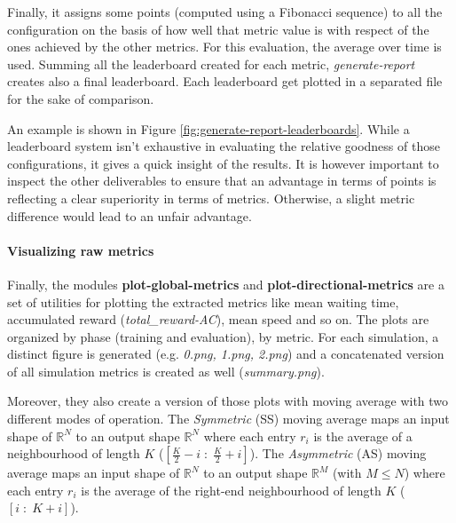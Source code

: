 Finally, it assigns some points (computed using a Fibonacci sequence) to all the configuration on the basis of how well that metric value is with respect of the ones achieved by the other metrics.
For this evaluation, the average over time is used.
Summing all the leaderboard created for each metric, \textit{generate-report} creates also a final leaderboard.
Each leaderboard get plotted in a separated file for the sake of comparison.

An example is shown in Figure \ref{fig:generate-report-leaderboards}.
While a leaderboard system isn't exhaustive in evaluating the relative goodness of those configurations, it gives a quick insight of the results.
It is however important to inspect the other deliverables to ensure that an advantage in terms of points is reflecting a clear superiority in terms of metrics.
Otherwise, a slight metric difference would lead to an unfair advantage.

\putimagecouple
{}
{}

\paragraph{Visualizing raw metrics}

Finally, the modules \textbf{plot-global-metrics} and \textbf{plot-directional-metrics} are a set of utilities for plotting the extracted metrics like mean waiting time, accumulated reward (\textit{total\_reward-AC}), mean speed and so on.
The plots are organized by phase (training and evaluation), by metric. For each simulation, a distinct figure is generated (e.g. \textit{0.png, 1.png, 2.png}) and a concatenated version of all simulation metrics is created as well (\textit{summary.png}).

Moreover, they also create a version of those plots with moving average with two different modes of operation.
The \textit{Symmetric} (SS) moving average maps an input shape of $\mathbb{R}^N$ to an output shape $\mathbb{R}^N$ where each entry $r_i$ is the average of a neighbourhood of length $K$ ($[\frac K 2 - i \; : \; \frac K 2 + i]$).
The \textit{Asymmetric} (AS) moving average maps an input shape of $\mathbb{R}^N$ to an output shape $\mathbb{R}^M$ (with $M \leq N$) where each entry $r_i$ is the average of the right-end neighbourhood of length $K$ ($[i \; : \; K + i]$).

